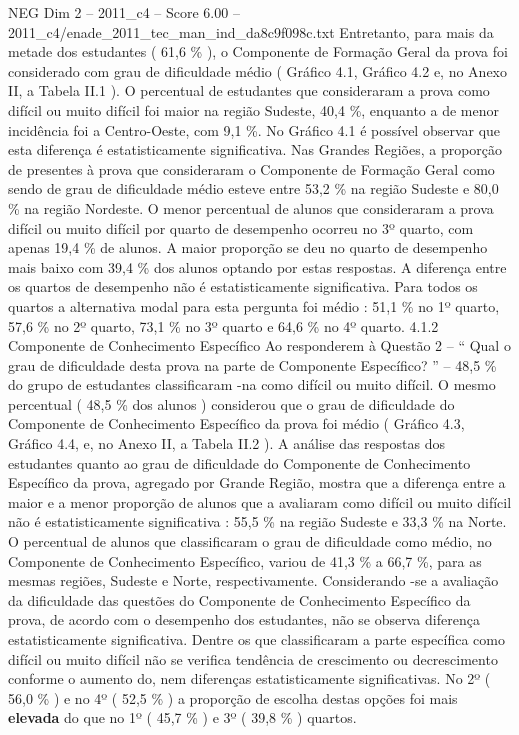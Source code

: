 \begin{textsample}{NEG Dim 2 – 2011\_c4 – Score 6.00 – 2011\_c4/enade\_2011\_tec\_man\_ind\_da8c9f098c.txt}
Entretanto, para mais da metade dos estudantes ( 61,6 \% ), o Componente de Formação Geral da prova foi considerado com grau de dificuldade médio ( Gráfico 4.1, Gráfico 4.2 e, no Anexo II, a Tabela II.1 ).
O percentual de estudantes que consideraram a prova como difícil ou muito difícil foi maior na região Sudeste, 40,4 \%, enquanto a de menor incidência foi a Centro-Oeste, com 9,1 \%.
No Gráfico 4.1 é possível observar que esta diferença é estatisticamente significativa.
Nas Grandes Regiões, a proporção de presentes à prova que consideraram o Componente de Formação Geral como sendo de grau de dificuldade médio esteve entre 53,2 \% na região Sudeste e 80,0 \% na região Nordeste.
O menor percentual de alunos que consideraram a prova difícil ou muito difícil por quarto de desempenho ocorreu no 3º quarto, com apenas 19,4 \% de alunos.
A maior proporção se deu no quarto de desempenho mais baixo com 39,4 \% dos alunos optando por estas respostas.
A diferença entre os quartos de desempenho não é estatisticamente significativa.
Para todos os quartos a alternativa modal para esta pergunta foi médio : 51,1 \% no 1º quarto, 57,6 \% no 2º quarto, 73,1 \% no 3º quarto e 64,6 \% no 4º quarto. 4.1.2 Componente de Conhecimento Específico Ao responderem à Questão 2 – “ Qual o grau de dificuldade desta prova na parte de Componente Específico? ” – 48,5 \% do grupo de estudantes classificaram -na como difícil ou muito difícil.
O mesmo percentual ( 48,5 \% dos alunos ) considerou que o grau de dificuldade do Componente de Conhecimento Específico da prova foi médio ( Gráfico 4.3, Gráfico 4.4, e, no Anexo II, a Tabela II.2 ).
A análise das respostas dos estudantes quanto ao grau de dificuldade do Componente de Conhecimento Específico da prova, agregado por Grande Região, mostra que a diferença entre a maior e a menor proporção de alunos que a avaliaram como difícil ou muito difícil não é estatisticamente significativa : 55,5 \% na região Sudeste e 33,3 \% na Norte.
O percentual de alunos que classificaram o grau de dificuldade como médio, no Componente de Conhecimento Específico, variou de 41,3 \% a 66,7 \%, para as mesmas regiões, Sudeste e Norte, respectivamente.
Considerando -se a avaliação da dificuldade das questões do Componente de Conhecimento Específico da prova, de acordo com o desempenho dos estudantes, não se observa diferença estatisticamente significativa.
Dentre os que classificaram a parte específica como difícil ou muito difícil não se verifica tendência de crescimento ou decrescimento conforme o aumento do, nem diferenças estatisticamente significativas.
No 2º ( 56,0 \% ) e no 4º ( 52,5 \% ) a proporção de escolha destas opções foi mais \textbf{elevada} do que no 1º ( 45,7 \% ) e 3º ( 39,8 \% ) quartos.

\end{textsample}
